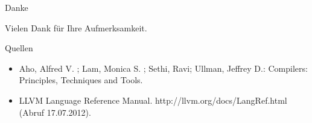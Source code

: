 \documentclass[ucs,9pt]{beamer}
\begin{document}
\begin{frame}{Danke}
	\begin{center}
		\begin{Large}Vielen Dank für Ihre Aufmerksamkeit.\end{Large}
	\end{center}
\end{frame}


\begin{frame}{Quellen}
	\begin{itemize}
		\item Aho, Alfred V. ; Lam, Monica S. ; Sethi, Ravi; Ullman, Jeffrey D.: Compilers: Principles, Techniques and Tools.
		\vspace{2mm}
		\item LLVM Language Reference Manual. http://llvm.org/docs/LangRef.html (Abruf 17.07.2012).
	\end{itemize}
\end{frame}
\end{document}
